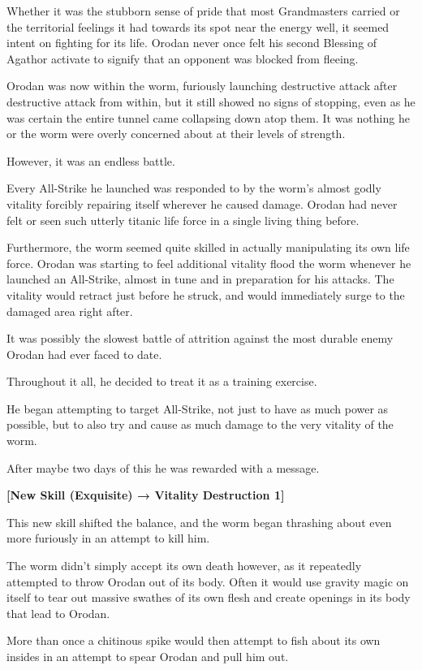 \documentclass[a4paper,10pt]{book}
\begin{document}
Whether it was the stubborn sense of pride that most Grandmasters carried or the territorial feelings it had towards its spot near the energy well, it seemed intent on fighting for its life. Orodan never once felt his second Blessing of Agathor activate to signify that an opponent was blocked from fleeing.\par
Orodan was now within the worm, furiously launching destructive attack after destructive attack from within, but it still showed no signs of stopping, even as he was certain the entire tunnel came collapsing down atop them. It was nothing he or the worm were overly concerned about at their levels of strength.\par
However, it was an endless battle.\par
Every All-Strike he launched was responded to by the worm’s almost godly vitality forcibly repairing itself wherever he caused damage. Orodan had never felt or seen such utterly titanic life force in a single living thing before.\par
Furthermore, the worm seemed quite skilled in actually manipulating its own life force. Orodan was starting to feel additional vitality flood the worm whenever he launched an All-Strike, almost in tune and in preparation for his attacks. The vitality would retract just before he struck, and would immediately surge to the damaged area right after.\par
It was possibly the slowest battle of attrition against the most durable enemy Orodan had ever faced to date.\par
Throughout it all, he decided to treat it as a training exercise.\par
He began attempting to target All-Strike, not just to have as much power as possible, but to also try and cause as much damage to the very vitality of the worm.\par
After maybe two days of this he was rewarded with a message.\par
\textbf{[New Skill (Exquisite) → Vitality Destruction 1]}\par
This new skill shifted the balance, and the worm began thrashing about even more furiously in an attempt to kill him.\par
The worm didn’t simply accept its own death however, as it repeatedly attempted to throw Orodan out of its body. Often it would use gravity magic on itself to tear out massive swathes of its own flesh and create openings in its body that lead to Orodan.\par
More than once a chitinous spike would then attempt to fish about its own insides in an attempt to spear Orodan and pull him out.\par
\end{document}

